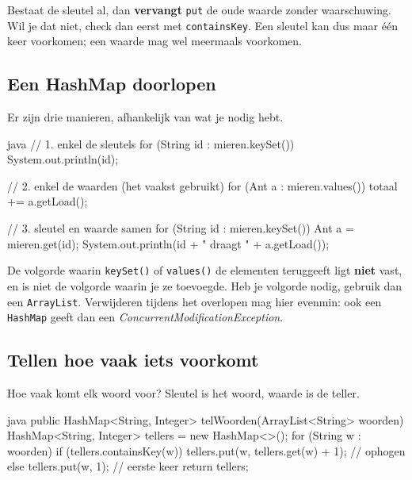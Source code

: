 \documentclass[a4paper,11pt]{article}
\begin{document}
\begin{warningbox}
    Bestaat de sleutel al, dan \textbf{vervangt} \texttt{put} de oude waarde zonder
    waarschuwing. Wil je dat niet, check dan eerst met \texttt{containsKey}. Een
    sleutel kan dus maar \'e\'en keer voorkomen; een waarde mag wel meermaals
    voorkomen.
\end{warningbox}

\subsection{Een HashMap doorlopen}

Er zijn drie manieren, afhankelijk van wat je nodig hebt.

\begin{codeblock}{java}
    // 1. enkel de sleutels
    for (String id : mieren.keySet()) {
            System.out.println(id);
        }

    // 2. enkel de waarden (het vaakst gebruikt)
    for (Ant a : mieren.values()) {
            totaal += a.getLoad();
        }

    // 3. sleutel en waarde samen
    for (String id : mieren.keySet()) {
            Ant a = mieren.get(id);
            System.out.println(id + " draagt " + a.getLoad());
        }
\end{codeblock}

\begin{warningbox}
    De volgorde waarin \texttt{keySet()} of \texttt{values()} de elementen teruggeeft
    ligt \textbf{niet} vast, en is niet de volgorde waarin je ze toevoegde. Heb je
    volgorde nodig, gebruik dan een \texttt{ArrayList}. Verwijderen tijdens het
    overlopen mag hier evenmin: ook een \texttt{HashMap} geeft dan een
    \textit{ConcurrentModificationException}.
\end{warningbox}

\subsection{Tellen hoe vaak iets voorkomt}

Hoe vaak komt elk woord voor? Sleutel is het woord, waarde is de teller.

\begin{codeblock}{java}
    public HashMap<String, Integer> telWoorden(ArrayList<String> woorden)
    {
            HashMap<String, Integer> tellers = new HashMap<>();
            for (String w : woorden)
            {
                    if (tellers.containsKey(w)) {
                            tellers.put(w, tellers.get(w) + 1); // ophogen
                        } else {
                            tellers.put(w, 1);                  // eerste keer
                        }
                }
            return tellers;
        }
\end{codeblock}
\end{document}
